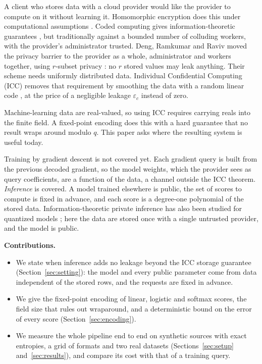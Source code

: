 \documentclass[conference]{IEEEtran}
\theoremstyle{remark}
\begin{document}
A client who stores data with a cloud provider would like the provider to compute on it
without learning it. Homomorphic encryption does this under computational assumptions
\cite{cryptonets2016}. Coded computing gives information-theoretic guarantees
\cite{yu2019lcc}, but traditionally against a bounded number of colluding workers, with the
provider's administrator trusted. Deng, Ramkumar and Raviv \cite{deng2024} moved the
privacy barrier to the provider as a whole, administrator and workers together, using
$r$-subset privacy \cite{raviv2022}: no $r$ stored values may leak anything. Their scheme
needs uniformly distributed data. Individual Confidential Computing (ICC) \cite{icc2025}
removes that requirement by smoothing the data with a random linear code
\cite{pathegama2024}, at the price of a negligible leakage $\varepsilon_c$ instead of zero.

Machine-learning data are real-valued, so using ICC requires carrying reals into the
finite field. A fixed-point encoding does this with a hard guarantee that no result wraps
around modulo $q$. This paper asks where the resulting system is useful today.

Training by gradient descent is not covered yet. Each gradient query is built from the
previous decoded gradient, so the model weights, which the provider sees as query
coefficients, are a function of the data, a channel outside the ICC theorem.
\emph{Inference} is covered. A model trained elsewhere is public, the set of scores to
compute is fixed in advance, and each score is a degree-one polynomial of the stored data.
Information-theoretic private inference has also been studied for quantized models
\cite{raviv2022quantized,deng2023approximate,deng2023private}; here the data are stored once
with a single untrusted provider, and the model is public.

\textbf{Contributions.}
\begin{itemize}
\item We state when inference adds no leakage beyond the ICC storage guarantee
      (Section~\ref{sec:setting}): the model and every public parameter come from data
      independent of the stored rows, and the requests are fixed in advance.
\item We give the fixed-point encoding of linear, logistic and softmax scores, the field
      size that rules out wraparound, and a deterministic bound on the error of every score
      (Section~\ref{sec:encoding}).
\item We measure the whole pipeline end to end on synthetic sources with exact entropies,
      a grid of formats and two real datasets (Sections~\ref{sec:setup}
      and~\ref{sec:results}), and compare its cost with that of a training query.
\end{itemize}
\end{document}
